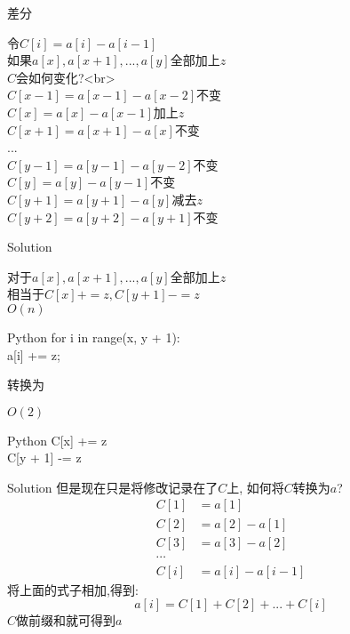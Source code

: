 \documentclass[aspectratio=169,xcolor=dvipsnames]{beamer}
\begin{document}
\begin{frame}{差分}

    令$C[i]=a[i]-a[i-1]$\\[20pt]

    如果$a[x],a[x+1],...,a[y]$全部加上$z$\\
    $C$会如何变化?<br>\\[20pt]

    $C[x-1]=a[x-1]-a[x-2]$不变\\
    \alert{$C[x]=a[x]-a[x-1]$加上$z$}\\
    $C[x+1]=a[x+1]-a[x]$不变\\
    ... \\
    $C[y-1]=a[y-1]-a[y-2]$不变\\
    $C[y]=a[y]-a[y-1]$不变\\
    \alert{$C[y+1]=a[y+1]-a[y]$减去$z$}\\
    $C[y+2]=a[y+2]-a[y+1]$不变

\end{frame}

\begin{frame}{Solution}

    对于$a[x],a[x+1],...,a[y]$全部加上$z$\\
    相当于$C[x]+=z,C[y+1]-=z$\\

    $O(n)$
    \begin{block}{Python}
        for i in range(x, y + 1):\\
        \quad a[i] += z;
    \end{block}
    转换为

    $O(2)$
    \begin{block}{Python}
        C[x] += z\\
        C[y + 1] -= z
    \end{block}

\end{frame}

\begin{frame}{Solution}
    但是现在只是将修改记录在了$C$上,
    如何将$C$转换为$a$?
    \begin{align*}
        C[1] & =a[1]        \\
        C[2] & =a[2]-a[1]\\
        C[3] & =a[3]-a[2]\\
        \cdots\\
        C[i] & =a[i]-a[i-1]
    \end{align*}
    将上面的式子相加,得到:
    $$
        a[i]=C[1]+C[2]+...+C[i]
    $$
    $C$做前缀和就可得到$a$

\end{frame}
\end{document}
